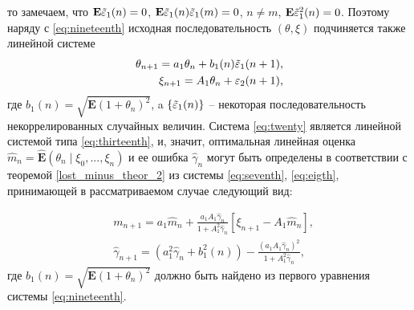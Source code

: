 \begin{example}
	то замечаем, что $\mathbf{E}\Tilde{\varepsilon}_1 (n) = 0$, $\mathbf{E}\Tilde{\varepsilon}_1 (n) \Tilde{\varepsilon}_1 (m) = 0$, $n \neq m$, $\mathbf{E}\Tilde{\varepsilon}_1^2 (n) = 0$. Поэтому наряду с \eqref{eq:nineteenth} исходная последовательность $(\theta, \xi)$ подчиняется также линейной системе
	\begin{align}
	\label{eq:twenty}
	\begin{split}
	\theta_{n+1} = a_1 \theta_n + b_1 (n) \Tilde{\varepsilon}_1 (n + 1), \\
	\xi_{n+1} = A_1 \theta_n + \varepsilon_2 (n + 1), 
	\end{split}
	\end{align}
	где $b_1 (n) = \sqrt{\mathbf{E} (1 + \theta_n)^2}$, a $\{\Tilde{\varepsilon}_1 (n)\}$ – некоторая последовательность некоррелированных случайных величин. Система \eqref{eq:twenty} является линейной системой типа \eqref{eq:thirteenth}, и, значит, оптимальная линейная оценка $\hat{m}_n =\mathbf{\widehat{E}} (\theta_n \mid \xi_0, ..., \xi_n)$ и ее ошибка $\hat{\gamma}_n$ могут быть определены в соответствии с теоремой \ref{lost_minus_theor_2} из системы \eqref{eq:seventh}, \eqref{eq:eigth}, принимающей в рассматриваемом случае следующий вид:

	\begin{align*}
	& m_{n+1} = a_1 \hat{m}_n + \frac{a_1 A_1 \hat{\gamma}_n}{1 + A_1^2 \hat{\gamma}_n} [\xi_{n+1} - A_1 \hat{m}_n], \\
	& \hat{\gamma}_{n+1} = (a^2_1 \hat{\gamma}_n + b^2_1 (n)) - \frac{(a_1 A_1 \hat{\gamma}_n)^2}{1 + A^2_1 \hat{\gamma}_n},
	\end{align*}
	где $b_1 (n) = \sqrt{\mathbf{E} (1 + \theta_n)^2}$ должно быть найдено из первого уравнения системы \eqref{eq:nineteenth}.
\end{example}

